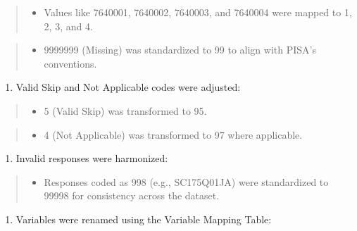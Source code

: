 \documentclass[
]{article}
\providecommand{\tightlist}{%
  \setlength{\itemsep}{0pt}\setlength{\parskip}{0pt}}
\begin{document}
\begin{quote}
\begin{itemize}
\tightlist
\item
  Values like 7640001, 7640002, 7640003, and 7640004 were mapped to 1,
  2, 3, and 4.
\end{itemize}
\end{quote}

\begin{quote}
\begin{itemize}
\tightlist
\item
  9999999 (Missing) was standardized to 99 to align with PISA's
  conventions.
\end{itemize}
\end{quote}

\begin{enumerate}
\def\labelenumi{\arabic{enumi}.}
\setcounter{enumi}{1}
\tightlist
\item
  Valid Skip and Not Applicable codes were adjusted:
\end{enumerate}

\begin{quote}
\begin{itemize}
\tightlist
\item
  5 (Valid Skip) was transformed to 95.
\end{itemize}
\end{quote}

\begin{quote}
\begin{itemize}
\tightlist
\item
  4 (Not Applicable) was transformed to 97 where applicable.
\end{itemize}
\end{quote}

\begin{enumerate}
\def\labelenumi{\arabic{enumi}.}
\setcounter{enumi}{2}
\tightlist
\item
  Invalid responses were harmonized:
\end{enumerate}

\begin{quote}
\begin{itemize}
\tightlist
\item
  Responses coded as 998 (e.g., SC175Q01JA) were standardized to 99998
  for consistency across the dataset.
\end{itemize}
\end{quote}

\begin{enumerate}
\def\labelenumi{\arabic{enumi}.}
\setcounter{enumi}{3}
\tightlist
\item
  Variables were renamed using the Variable Mapping Table:
\end{enumerate}
\end{document}
